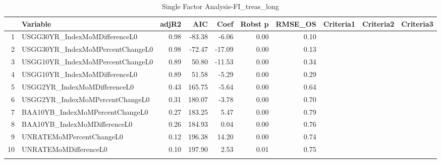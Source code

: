 \begin{longtable}{rlrrrrrlll}
  \hline
 & Variable & adjR2 & AIC & Coef & Robst p & RMSE\_OS & Criteria1 & Criteria2 & Criteria3 \\ 
  \hline
1 & USGG30YR\_IndexMoMDifferenceL0 & 0.98 & -83.38 & -6.06 & 0.00 & 0.10 &  &  &  \\ 
  2 & USGG30YR\_IndexMoMPercentChangeL0 & 0.98 & -72.47 & -17.09 & 0.00 & 0.13 &  &  &  \\ 
  3 & USGG10YR\_IndexMoMPercentChangeL0 & 0.89 & 50.80 & -11.53 & 0.00 & 0.34 &  &  &  \\ 
  4 & USGG10YR\_IndexMoMDifferenceL0 & 0.89 & 51.58 & -5.29 & 0.00 & 0.29 &  &  &  \\ 
  5 & USGG2YR\_IndexMoMDifferenceL0 & 0.43 & 165.75 & -5.64 & 0.00 & 0.64 &  &  &  \\ 
  6 & USGG2YR\_IndexMoMPercentChangeL0 & 0.31 & 180.07 & -3.78 & 0.00 & 0.70 &  &  &  \\ 
  7 & BAA10YB\_IndexMoMPercentChangeL0 & 0.27 & 183.25 & 5.47 & 0.00 & 0.79 &  &  &  \\ 
  8 & BAA10YB\_IndexMoMDifferenceL0 & 0.26 & 184.93 & 0.04 & 0.00 & 0.76 &  &  &  \\ 
  9 & UNRATEMoMPercentChangeL0 & 0.12 & 196.38 & 14.20 & 0.00 & 0.74 &  &  &  \\ 
  10 & UNRATEMoMDifferenceL0 & 0.10 & 197.90 & 2.53 & 0.01 & 0.75 &  &  &  \\ 
   \hline
\hline
\caption{Single Factor Analysis-FI_treas_long} 
\end{longtable}
